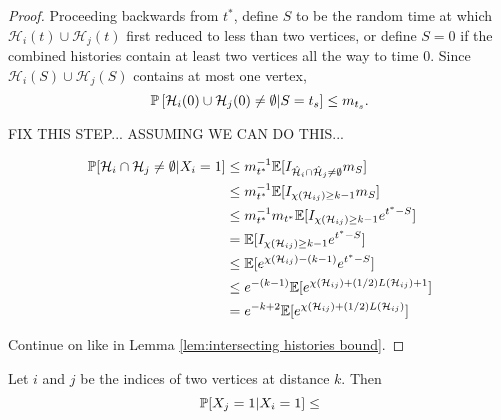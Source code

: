 \begin{proof}
	Proceeding backwards from $t^*$, define $S$ to be the random time at which $\mathcal{H}_i(t) \cup \mathcal{H}_j(t)$ first reduced to less than two vertices, or define $S = 0$ if the combined histories contain at least two vertices all the way to time $0$. Since $\mathcal{H}_i(S) \cup \mathcal{H}_j(S)$ contains at most one vertex,
	\begin{equation}
		\mathbb{P}\left[\mathcal{H}_i(0) \cup \mathcal{H}_j(0) \neq \emptyset | S = t_s\right] \leq m_{t_s}.
	\end{equation}

	FIX THIS STEP...  ASSUMING WE CAN DO THIS...

	\begin{align}
		\mathbb{P}[\mathcal{H}_i \cap \mathcal{H}_j \neq \emptyset | X_i = 1] &\leq m_{t^*}^{-1} \mathbb{E}[I_{\hat{\mathcal{H}}_i \cap \hat{\mathcal{H}}_j \neq \emptyset} m_S] \\
		&\leq m_{t^*}^{-1} \mathbb{E}[I_{\chi(\mathcal{H}_{ij}) \geq k-1} m_S]\\
		&\leq m_{t^*}^{-1} m_{t^*} \mathbb{E}[I_{\chi(\mathcal{H}_{ij}) \geq k-1} e^{t^* - S}]\\
		&= \mathbb{E}[I_{\chi(\mathcal{H}_{ij}) \geq k-1} e^{t^* - S}]\\
		&\leq \mathbb{E}[e^{\chi(\mathcal{H}_{ij}) - (k-1)} e^{t^* - S}]\\
		&\leq e^{-(k-1)} \mathbb{E}[e^{\chi(\mathcal{H}_{ij}) + (1/2)L(\mathcal{H}_{ij}) + 1} ]\\
		&= e^{-k + 2} \mathbb{E}[e^{\chi(\mathcal{H}_{ij}) + (1/2)L(\mathcal{H}_{ij})} ]
	\end{align}

	Continue on like in Lemma \ref{lem:intersecting histories bound}.
\end{proof}
\begin{lemma}
	Let $i$ and $j$ be the indices of two vertices at distance $k$. Then
	\begin{equation}
		\mathbb{P}[X_j = 1 | X_i = 1] \leq
	\end{equation}
\end{lemma}
